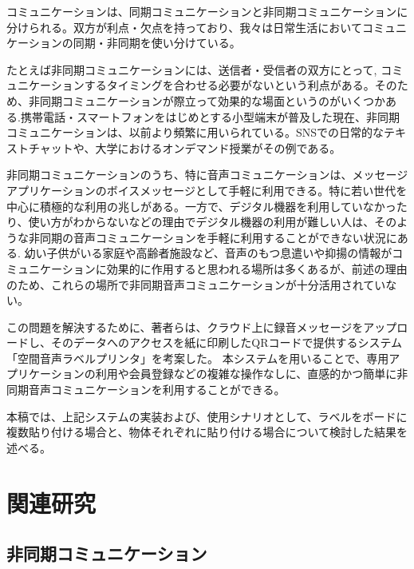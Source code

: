 \documentclass[submit,techrep,noauthor]{ipsj}
\begin{document}
コミュニケーションは、同期コミュニケーションと非同期コミュニケーションに分けられる。双方が利点・欠点を持っており、我々は日常生活においてコミュニケーションの同期・非同期を使い分けている。\par
たとえば非同期コミュニケーションには、送信者・受信者の双方にとって, コミュニケーションするタイミングを合わせる必要がないという利点がある。そのため、非同期コミュニケーションが際立って効果的な場面\cite{effective}というのがいくつかある.携帯電話・スマートフォンをはじめとする小型端末が普及した現在、非同期コミュニケーションは、以前より頻繁に用いられている。SNSでの日常的なテキストチャットや、大学におけるオンデマンド授業がその例である。\par
非同期コミュニケーションのうち、特に音声コミュニケーションは、メッセージアプリケーションのボイスメッセージとして手軽に利用できる。特に若い世代を中心に積極的な利用の兆しがある\cite{vox}。一方で、デジタル機器を利用していなかったり、使い方がわからないなどの理由でデジタル機器の利用が難しい人は、そのような非同期の音声コミュニケーションを手軽に利用することができない状況にある\cite{divide-1}\cite{divide-2}. 幼い子供がいる家庭や高齢者施設など、音声のもつ息遣いや抑揚の情報がコミュニケーションに効果的に作用すると思われる場所は多くあるが、前述の理由のため、これらの場所で非同期音声コミュニケーションが十分活用されていない。\par
この問題を解決するために、著者らは、クラウド上に録音メッセージをアップロードし、そのデータへのアクセスを紙に印刷したQRコードで提供するシステム「空間音声ラベルプリンタ」を考案した。
本システムを用いることで、専用アプリケーションの利用や会員登録などの複雑な操作なしに、直感的かつ簡単に非同期音声コミュニケーションを利用することができる。\par
本稿では、上記システムの実装および、使用シナリオとして、ラベルをボードに複数貼り付ける場合と、物体それぞれに貼り付ける場合について検討した結果を述べる。

\section{関連研究}


\subsection{非同期コミュニケーション}
\end{document}
